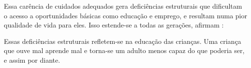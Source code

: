 
Essa carência de cuidados adequados gera deficiências estruturais que dificultam o acesso a oportunidades básicas como educação e emprego, e resultam numa pior qualidade de vida para eles.
Isso estende-se a todas as gerações, afirmam :

\begin{citacao}
    Essas deficiências estruturais refletem-se na educação das crianças. Uma criança que ouve mal aprende mal e torna-se um adulto menos capaz do que poderia ser, e assim por diante.~\cite{ebc-2021-oms-estima}
\end{citacao}



